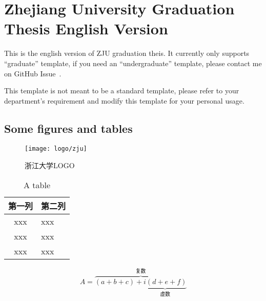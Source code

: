 \chapter{Zhejiang University Graduation Thesis English Version}

This is the english version of ZJU graduation theis.
It currently only supports ``graduate'' template,
if you need an ``undergraduate'' template,
please contact me on GitHub Issue~\cite{zjuthesis}.

This template is not meant to be a standard template,
please refer to your department's requirement and modify this template for your personal usage.

\section{Some figures and tables}

\begin{figure}[htbp]
    \centering
    \texttt{[image: logo/zju]}
    \caption{\label{fig:zju-logo}浙江大学LOGO}
\end{figure}

\begin{table}[htbp]
    \caption{\label{tab:sample}A table}
    \begin{tabularx}{\linewidth}{c|X<{\centering}}
        \hline
        第一列 & 第二列 \\ \hline
        xxx & xxx \\ \hline
        xxx & xxx \\ \hline
        xxx & xxx \\ \hline
    \end{tabularx}
\end{table}


\begin{equation}
    \label{equ:sample}
    A=\overbrace{(a+b+c)+\underbrace{i(d+e+f)}_{\text{虚数}}}^{\text{复数}}
\end{equation}